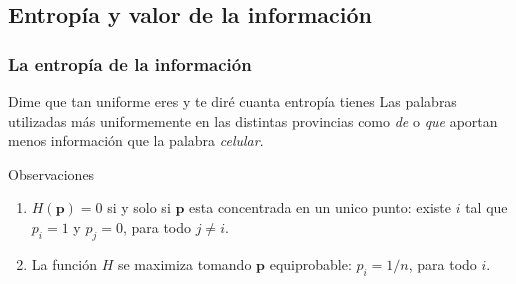 

\subsection{Entropía y valor de la información}

\begin{frame}[t]\frametitle{La entropía de la información}
    

{
    \begin{exampleblock}{Dime que tan uniforme eres y te diré cuanta entropía tienes} Las palabras utilizadas más uniformemente en las distintas provincias como \textit{de} o \textit{que} aportan menos información que la palabra \textit{celular}. 
\end{exampleblock}
}

{
    \begin{block}{Observaciones}
        \begin{enumerate}
            \item $H(\mathbf{p})=0$ si y solo si $\mathbf{p}$ esta concentrada en un unico punto: existe $i$ tal que $p_i=1$ y $p_j=0$, para todo $j\not=i$. 
            \item La funci\'on $H$ se maximiza tomando $\mathbf{p}$ equiprobable: $p_i=1/n$, para todo $i$. 

        \end{enumerate}

    \end{block}
}
\end{frame}



